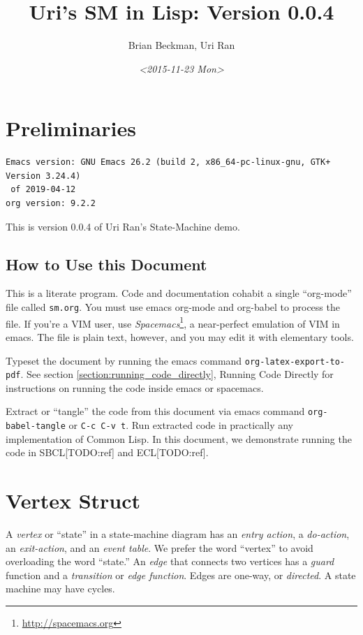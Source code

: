 \documentclass[10pt,oneside,x11names]{article}
\author{Brian Beckman, Uri Ran}
\date{\textit{<2015-11-23 Mon>}}
\title{Uri's SM in Lisp: Version 0.0.4}
\begin{document}
\maketitle
\setcounter{tocdepth}{2}
\tableofcontents


\section{Preliminaries}
\label{sec:org836cea5}

\begin{verbatim}
Emacs version: GNU Emacs 26.2 (build 2, x86_64-pc-linux-gnu, GTK+ Version 3.24.4)
 of 2019-04-12
org version: 9.2.2
\end{verbatim}


This is version 0.0.4 of Uri Ran's State-Machine demo.

\subsection{How to Use this Document}
\label{sec:org4226d0c}

This is a literate program. Code and documentation cohabit a single
``org-mode'' file called \texttt{sm.org}. You must use emacs org-mode and org-babel to
process the file. If you're a VIM user, use \emph{Spacemacs}\footnote{\url{http://spacemacs.org}}, a
near-perfect emulation of VIM in emacs. The file is plain text, however, and
you may edit it with elementary tools.

Typeset the document by running the emacs command \texttt{org-latex-export-to-pdf}.
See section \ref{section:running_code_directly}, Running Code Directly for
instructions on running the code inside emacs or spacemacs.

Extract or ``tangle'' the code from this document via emacs command
\texttt{org-babel-tangle} or \texttt{C-c C-v t}. Run extracted code in practically any
implementation of Common Lisp. In this document, we demonstrate running the
code in SBCL[TODO:ref] and ECL[TODO:ref].

\section{Vertex Struct}
\label{sec:org9853fe4}

A \emph{vertex} or ``state'' in a state-machine diagram has an \emph{entry action}, a
\emph{do-action}, an \emph{exit-action}, and an \emph{event table}. We prefer the word
``vertex'' to avoid overloading the word ``state.'' An \emph{edge} that connects two
vertices has a \emph{guard} function and a \emph{transition} or \emph{edge function}. Edges
are one-way, or \emph{directed}. A state machine may have cycles.
\end{document}
